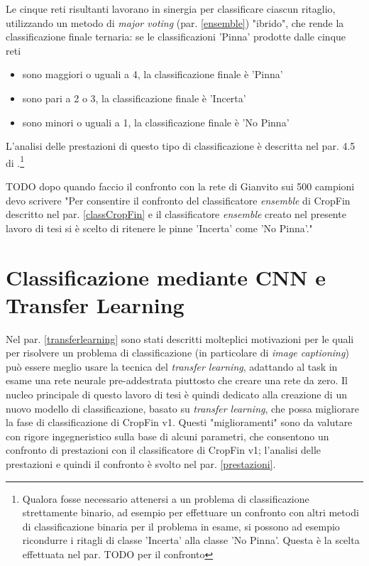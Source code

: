 Le cinque reti risultanti lavorano in sinergia per classificare ciascun ritaglio, utilizzando un metodo di \textit{major voting} (par. \ref{ensemble}) "ibrido", che rende la classificazione finale ternaria: se le classificazioni 'Pinna' prodotte dalle cinque reti
\begin{itemize}
\item sono maggiori o uguali a 4, la classificazione finale è 'Pinna'
\item sono pari a 2 o 3, la classificazione finale è 'Incerta'
\item sono minori o uguali a 1, la classificazione finale è 'No Pinna'
\end{itemize}
L'analisi delle prestazioni di questo tipo di classificazione è descritta nel par. 4.5 di \cite{gianvito}.\footnote{Qualora fosse necessario attenersi a un problema di classificazione strettamente binario, ad esempio per effettuare un confronto con altri metodi di classificazione binaria per il problema in esame, si possono ad esempio ricondurre i ritagli di classe 'Incerta' alla classe 'No Pinna'. Questa è la scelta effettuata nel par. TODO per il confronto}



TODO dopo quando faccio il confronto con la rete di Gianvito sui 500 campioni devo scrivere "Per consentire il confronto del classificatore \textit{ensemble} di CropFin descritto nel par. \ref{classCropFin} e il classificatore \textit{ensemble} creato nel presente lavoro di tesi si è scelto di ritenere le pinne 'Incerta' come 'No Pinna'."

\section{Classificazione mediante CNN e Transfer Learning}
\label{esperimentoTL}
Nel par. \ref{transferlearning} sono stati descritti molteplici motivazioni per le quali per risolvere un problema di classificazione (in particolare di \textit{image captioning}) può essere meglio usare la tecnica del \textit{transfer learning}, adattando al task in esame una rete neurale pre-addestrata piuttosto che creare una rete da zero.
Il nucleo principale di questo lavoro di tesi è quindi dedicato alla creazione di un nuovo modello di classificazione, basato su \textit{transfer learning}, che possa migliorare la fase di classificazione di CropFin v1. Questi "miglioramenti" sono da valutare con rigore ingegneristico sulla base di alcuni parametri, che consentono un confronto di prestazioni con il classificatore di CropFin v1; l'analisi delle prestazioni e quindi il confronto è svolto nel par. \ref{prestazioni}.

